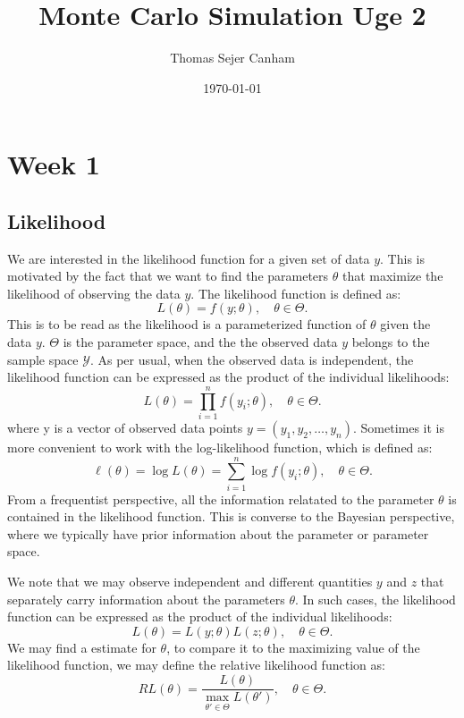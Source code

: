 \documentclass{article}
\title{Monte Carlo Simulation Uge 2}
\author{Thomas Sejer Canham}
\date{\today}
\theoremstyle{definition}
\theoremstyle{remark}
\begin{document}
\section{Week 1}
\subsection{Likelihood}

We are interested in the likelihood function for a given set of data $y$. This is motivated by the fact that we want to find the parameters $\theta$ that maximize the likelihood of observing the data $y$. The likelihood function is defined as:
\begin{equation}
L(\theta) = f(y ; \theta), \quad \theta \in \Theta.
\end{equation}
This is to be read as the likelihood is a parameterized function of $\theta$ given the data $y$. $\Theta$ is the parameter space, and the the observed data $y$ belongs to the sample space $\mathcal{Y}$. As per usual, when the observed data is independent, the likelihood function can be expressed as the product of the individual likelihoods:
\begin{equation}
L(\theta) = \prod_{i=1}^{n} f(y_i ; \theta), \quad \theta \in \Theta.
\end{equation}
where y is a vector of observed data points $y = (y_1, y_2, \ldots, y_n)$. Sometimes it is more convenient to work with the log-likelihood function, which is defined as:
\begin{equation}
\ell(\theta) = \log L(\theta) = \sum_{i=1}^{n} \log f(y_i ; \theta), \quad \theta \in \Theta.
\end{equation}
From a frequentist perspective, all the information relatated to the parameter $\theta$ is contained in the likelihood function. This is converse to the Bayesian perspective, where we typically have prior information about the parameter or parameter space.


We note that we may observe independent and different quantities $y$ and $z$ that separately carry information about the parameters $\theta$. In such cases, the likelihood function can be expressed as the product of the individual likelihoods:
\begin{equation}
L(  \theta) = L(y; \theta) L(z; \theta), \quad \theta \in \Theta.
\end{equation}
We may find a estimate for $\theta$, to compare it to the maximizing value of the likelihood function, we may define the relative likelihood function as:
\begin{equation}
RL(\theta) = \dfrac{L(\theta)}{\max_{\theta' \in \Theta} L(\theta')}, \quad \theta \in \Theta.
\end{equation}
\end{document}
